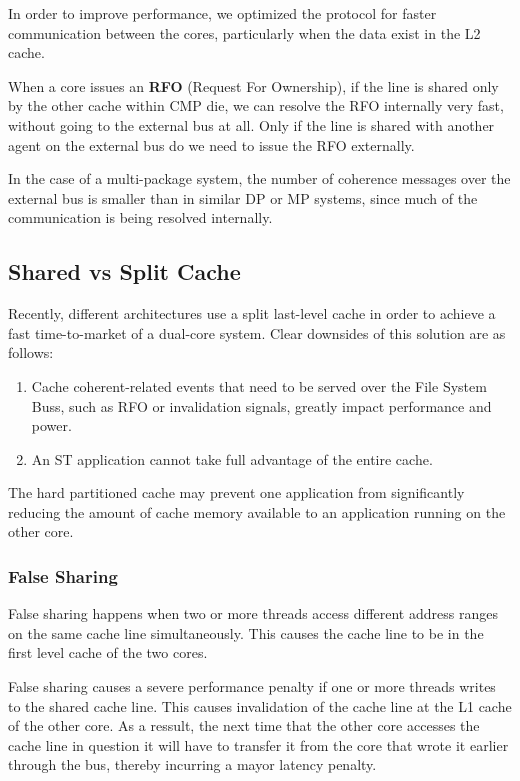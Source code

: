 In order to improve performance, we optimized the protocol for faster communication between the cores, particularly when the data exist in the L2 cache.

When a core issues an \textbf{RFO} (Request For Ownership), if the line is shared only by the other cache within CMP die, we can resolve the RFO internally very fast, without going to the external bus at all. Only if the line is shared with another agent on the external bus do we need to issue the RFO externally.

In the case of a multi-package system, the number of coherence messages over the external bus is smaller than in similar DP or MP systems, since much of the communication is being resolved internally.

\subsection{Shared vs Split Cache}
Recently, different architectures use a split last-level cache in order to achieve a fast time-to-market of a dual-core system. Clear downsides of this solution are as follows:
\begin{enumerate}
	\item Cache coherent-related events that need to be served over the File System Buss, such as RFO or invalidation signals, greatly impact performance and power.
	\item An ST application cannot take full advantage of the entire cache.
\end{enumerate}

The hard partitioned cache may prevent one application from significantly reducing the amount of cache memory available to an application running on the other core.

\subsubsection{False Sharing}
False sharing happens when two or more threads access different address ranges on the same cache line simultaneously. This causes the cache line to be in the first level cache of the two cores.

False sharing causes a severe performance penalty if one or more threads writes to the shared cache line. This causes invalidation of the cache line at the L1 cache of the other core. As a ressult, the next time that the other core accesses the cache line in question it will have to transfer it from the core that wrote it earlier through the bus, thereby incurring a mayor latency penalty.

